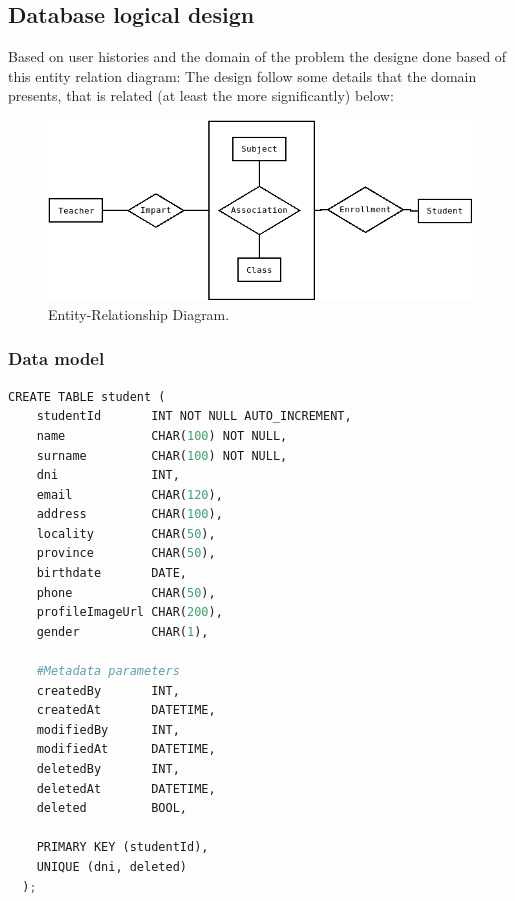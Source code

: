 \subsection{Database logical design}

Based on user histories and the domain of the problem the designe
done based of this entity relation diagram:
\intro
The design follow some details that the domain presents, that is related
(at least the more significantly) below:

\begin{figure}[H]
  \includegraphics[scale=0.4]{img/diagrams/dbms-ER.png}
  \centering
  \caption{Entity-Relationship Diagram.}
\end{figure}


\subsubsection{Data model}
\begin{lstlisting}[language=python,frame=none]
  CREATE TABLE student (
    studentId       INT NOT NULL AUTO_INCREMENT,
    name            CHAR(100) NOT NULL,
    surname         CHAR(100) NOT NULL,
    dni             INT,
    email           CHAR(120),
    address         CHAR(100),
    locality        CHAR(50),
    province        CHAR(50),
    birthdate       DATE,
    phone           CHAR(50),
    profileImageUrl CHAR(200),
    gender          CHAR(1),

    #Metadata parameters
    createdBy       INT,
    createdAt       DATETIME,
    modifiedBy      INT,
    modifiedAt      DATETIME,
    deletedBy       INT,
    deletedAt       DATETIME,
    deleted         BOOL,

    PRIMARY KEY (studentId),
    UNIQUE (dni, deleted)
  );
\end{lstlisting}

